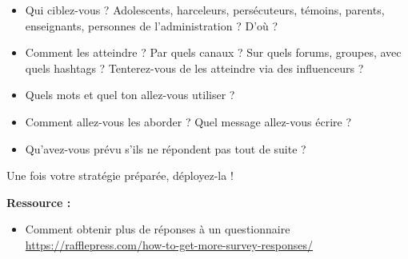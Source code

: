 \begin{itemize}
\item Qui ciblez-vous ? Adolescents, harceleurs, persécuteurs, témoins, parents, enseignants, personnes de l'administration ? D'où ?
\item Comment les atteindre ? Par quels canaux ? Sur quels forums, groupes, avec quels hashtags ? Tenterez-vous de les atteindre via des influenceurs ?
\item Quels mots et quel ton allez-vous utiliser ?
\item Comment allez-vous les aborder ? Quel message allez-vous écrire ?
\item Qu'avez-vous prévu s'ils ne répondent pas tout de suite ?
\end{itemize}

Une fois votre stratégie préparée, déployez-la !

\textbf{Ressource :}

\begin{itemize}
\item Comment obtenir plus de réponses à un questionnaire \url{https://rafflepress.com/how-to-get-more-survey-responses/}
\end{itemize}

